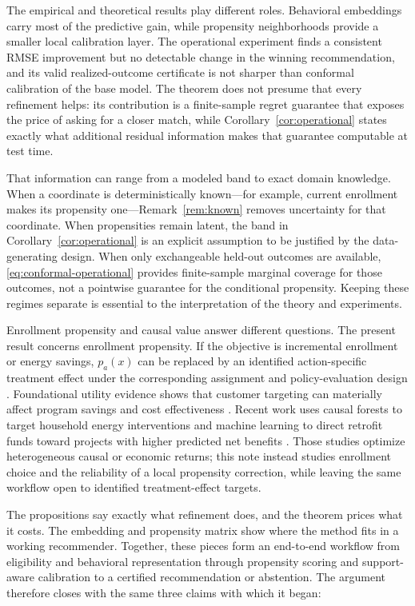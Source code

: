 \documentclass[11pt]{article}
\theoremstyle{noteplain}
\theoremstyle{definition}
\begin{document}
The empirical and theoretical results play different roles. Behavioral embeddings carry most of the predictive gain, while propensity neighborhoods provide a smaller local calibration layer. The operational experiment finds a consistent RMSE improvement but no detectable change in the winning recommendation, and its valid realized-outcome certificate is not sharper than conformal calibration of the base model. The theorem does not presume that every refinement helps: its contribution is a finite-sample regret guarantee that exposes the price of asking for a closer match, while Corollary~\ref{cor:operational} states exactly what additional residual information makes that guarantee computable at test time.

That information can range from a modeled band to exact domain knowledge. When a coordinate is deterministically known---for example, current enrollment makes its propensity one---Remark~\ref{rem:known} removes uncertainty for that coordinate. When propensities remain latent, the band in Corollary~\ref{cor:operational} is an explicit assumption to be justified by the data-generating design. When only exchangeable held-out outcomes are available, \eqref{eq:conformal-operational} provides finite-sample marginal coverage for those outcomes, not a pointwise guarantee for the conditional propensity. Keeping these regimes separate is essential to the interpretation of the theory and experiments.

Enrollment propensity and causal value answer different questions. The present result concerns enrollment propensity. If the objective is incremental enrollment or energy savings, $p_a(x)$ can be replaced by an identified action-specific treatment effect under the corresponding assignment and policy-evaluation design \cite{dudik}. Foundational utility evidence shows that customer targeting can materially affect program savings and cost effectiveness \cite{jones}. Recent work uses causal forests to target household energy interventions \cite{knittel} and machine learning to direct retrofit funds toward projects with higher predicted net benefits \cite{christensen}. Those studies optimize heterogeneous causal or economic returns; this note instead studies enrollment choice and the reliability of a local propensity correction, while leaving the same workflow open to identified treatment-effect targets.

The propositions say exactly what refinement does, and the theorem prices what it costs. The embedding and propensity matrix show where the method fits in a working recommender. Together, these pieces form an end-to-end workflow from eligibility and behavioral representation through propensity scoring and support-aware calibration to a certified recommendation or abstention. The argument therefore closes with the same three claims with which it began:
\end{document}
